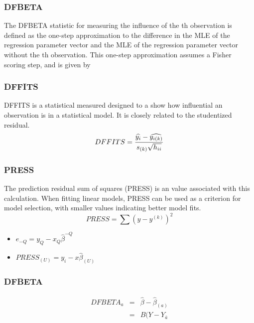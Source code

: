 \documentclass[12pt, a4paper]{article}
\theoremstyle{plain}
\theoremstyle{definition}
\theoremstyle{remark}
\begin{document}
\subsubsection{DFBETA}

The DFBETA statistic for measuring the influence of 
the th observation is defined as the one-step approximation to 
the difference in the MLE of the regression parameter vector and 
the MLE of the regression parameter vector without the th 
observation. This one-step approximation assumes a Fisher 
scoring step, and is given by



\subsubsection{DFFITS} %
DFFITS is a statistical measured designed to a show how influential an observation is in a statistical model. It is closely related to the studentized residual.
\begin{displaymath} DFFITS = {\widehat{y_i} -
\widehat{y_{i(k)}} \over s_{(k)} \sqrt{h_{ii}}} \end{displaymath}


\subsubsection{PRESS} %
The prediction residual sum of squares (PRESS) is an value associated with this calculation. When fitting linear models, PRESS can be used as a criterion for model selection, with smaller values indicating better model fits.
\begin{equation}
PRESS = \sum(y-y^{(k)})^2
\end{equation}


\begin{itemize}
\item $e_{-Q} = y_{Q} - x_{Q}\hat{\beta}^{-Q}$
\item $PRESS_{(U)} = y_{i} - x\hat{\beta}_{(U)}$
\end{itemize}

\subsubsection{DFBETA} %
\begin{eqnarray}
DFBETA_{a} &=& \hat{\beta} - \hat{\beta}_{(a)} \\
&=& B(Y-Y_{\bar{a}}
\end{eqnarray}
\newpage
\end{document}
